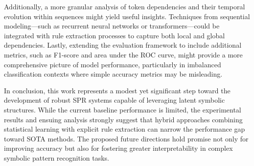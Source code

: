 \documentclass{article}
\begin{document}
Additionally, a more granular analysis of token dependencies and their temporal evolution within sequences might yield useful insights. Techniques from sequential modeling—such as recurrent neural networks or transformers—could be integrated with rule extraction processes to capture both local and global dependencies. Lastly, extending the evaluation framework to include additional metrics, such as F1-score and area under the ROC curve, might provide a more comprehensive picture of model performance, particularly in imbalanced classification contexts where simple accuracy metrics may be misleading.

In conclusion, this work represents a modest yet significant step toward the development of robust SPR systems capable of leveraging latent symbolic structures. While the current baseline performance is limited, the experimental results and ensuing analysis strongly suggest that hybrid approaches combining statistical learning with explicit rule extraction can narrow the performance gap toward SOTA methods. The proposed future directions hold promise not only for improving accuracy but also for fostering greater interpretability in complex symbolic pattern recognition tasks.
\end{document}
